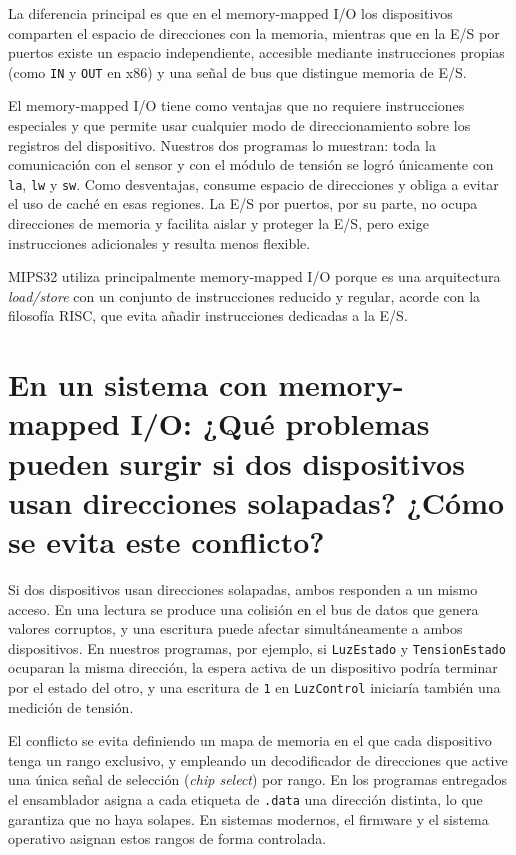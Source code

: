 \documentclass[12pt,a4paper]{article}
\begin{document}
La diferencia principal es que en el memory-mapped I/O los dispositivos comparten el espacio de direcciones con la memoria, mientras que en la E/S por puertos existe un espacio independiente, accesible mediante instrucciones propias (como \texttt{IN} y \texttt{OUT} en x86) y una señal de bus que distingue memoria de E/S.

El memory-mapped I/O tiene como ventajas que no requiere instrucciones especiales y que permite usar cualquier modo de direccionamiento sobre los registros del dispositivo. Nuestros dos programas lo muestran: toda la comunicación con el sensor y con el módulo de tensión se logró únicamente con \texttt{la}, \texttt{lw} y \texttt{sw}. Como desventajas, consume espacio de direcciones y obliga a evitar el uso de caché en esas regiones. La E/S por puertos, por su parte, no ocupa direcciones de memoria y facilita aislar y proteger la E/S, pero exige instrucciones adicionales y resulta menos flexible.

MIPS32 utiliza principalmente memory-mapped I/O porque es una arquitectura \emph{load/store} con un conjunto de instrucciones reducido y regular, acorde con la filosofía RISC, que evita añadir instrucciones dedicadas a la E/S.

\section{En un sistema con memory-mapped I/O: ¿Qué problemas pueden surgir si dos dispositivos usan direcciones solapadas? ¿Cómo se evita este conflicto?}

Si dos dispositivos usan direcciones solapadas, ambos responden a un mismo acceso. En una lectura se produce una colisión en el bus de datos que genera valores corruptos, y una escritura puede afectar simultáneamente a ambos dispositivos. En nuestros programas, por ejemplo, si \texttt{LuzEstado} y \texttt{TensionEstado} ocuparan la misma dirección, la espera activa de un dispositivo podría terminar por el estado del otro, y una escritura de \texttt{1} en \texttt{LuzControl} iniciaría también una medición de tensión.

El conflicto se evita definiendo un mapa de memoria en el que cada dispositivo tenga un rango exclusivo, y empleando un decodificador de direcciones que active una única señal de selección (\emph{chip select}) por rango. En los programas entregados el ensamblador asigna a cada etiqueta de \texttt{.data} una dirección distinta, lo que garantiza que no haya solapes. En sistemas modernos, el firmware y el sistema operativo asignan estos rangos de forma controlada.
\end{document}
